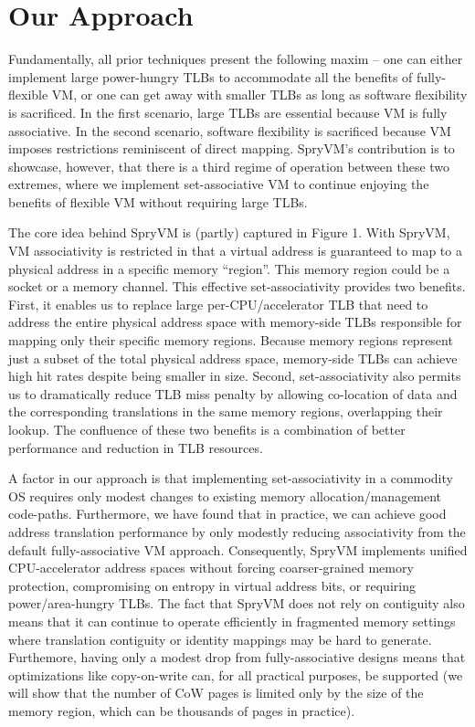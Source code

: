 \section{Our Approach}\label{our-approach}
Fundamentally, all prior techniques present the following maxim -- one
can either implement large power-hungry TLBs to accommodate all the
benefits of fully-flexible VM, or one can get away with smaller TLBs
as long as software flexibility is sacrificed. In the first scenario,
large TLBs are essential because VM is fully associative. In the
second scenario, software flexibility is sacrificed because VM imposes
restrictions reminiscent of direct mapping. SpryVM's contribution is
to showcase, however, that there is a third regime of operation
between these two extremes, where we implement set-associative VM to
continue enjoying the benefits of flexible VM without requiring large
TLBs. 

The core idea behind SpryVM is (partly) captured in Figure 1. With
SpryVM, VM associativity is restricted in that a virtual address is
guaranteed to map to a physical address in a specific memory
``region''. This memory region could be a socket or a memory
channel. This effective set-associativity provides two
benefits. First, it enables us to replace large per-CPU/accelerator
TLB that need to address the entire physical address space with
memory-side TLBs responsible for mapping only their specific memory
regions. Because memory regions represent just a subset of the total
physical address space, memory-side TLBs can achieve high hit rates
despite being smaller in size. Second, set-associativity also permits
us to dramatically reduce TLB miss penalty by allowing co-location of data and
the corresponding translations in the same memory regions, overlapping their
lookup. The confluence of these two benefits is a combination of
better performance and reduction in TLB resources. 

A factor in our approach is that implementing set-associativity in a
commodity OS requires only modest changes to existing memory
allocation/management code-paths. Furthermore, we have found that in
practice, we can achieve good address translation performance by only
modestly reducing associativity from the default fully-associative VM
approach. Consequently, SpryVM implements unified CPU-accelerator
address spaces without forcing coarser-grained memory protection,
compromising on entropy in virtual address bits, or requiring
power/area-hungry TLBs. The fact that SpryVM does not rely on
contiguity also means that it can continue to operate efficiently in
fragmented memory settings where translation contiguity or identity
mappings may be hard to generate. Furthemore, having only a modest drop
from fully-associative designs means that optimizations like
copy-on-write can, for all practical purposes, be supported (we will
show that the number of CoW pages is limited only by the size of the
memory region, which can be thousands of pages in practice).


